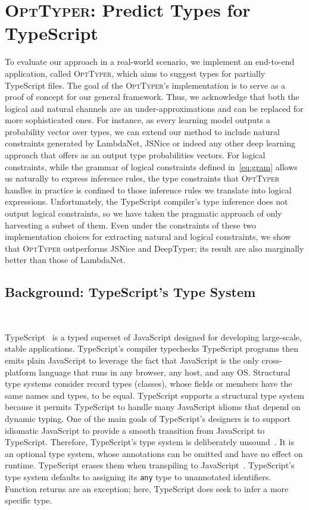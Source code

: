 \documentclass[acmsmall, review, anonymous]{acmart}\settopmatter{printfolios=true,printccs=false,printacmref=false}
\newcommand{\projectname}{\textsc{OptTyper}\xspace}
\begin{document}
\section{\projectname: Predict Types for TypeScript}
\label{sec:prodts}
To evaluate our approach in a real-world scenario, we
implement an end-to-end application, called \projectname, which aims
to suggest types for partially TypeScript files. The goal of the
\projectname{}'s implementation 
is to serve as a proof of concept for our general framework. Thus, we acknowledge that both the
logical and natural channels are an under-approximations and can be replaced for more
sophisticated ones. For instance, as every learning model outputs a probability vector
over types, we can extend our method to include natural constraints generated by LambdaNet, JSNice or indeed any other deep learning approach that offers as an output type probabilities vectors. 
For logical constraints, while
the grammar of logical constraints defined
in~\eqref{eq:gram} allows us naturally to express inference rules, the type constraints that \projectname handles in practice is confined to  
those inference rules we translate into logical expressions.
Unfortunately, the TypeScript compiler's type inference does not output logical constraints, so we 
have taken the pragmatic approach of only 
harvesting a subset of them. 
Even under the constraints of these two implementation choices for extracting natural and logical constraints, we show that \projectname outperforms JSNice and DeepTyper; its result are also marginally better than those of LambdaNet.

\subsection{Background: TypeScript's Type System}~\label{ssec:intro-typescript}

TypeScript~\citep{typescript} is a typed superset of
JavaScript designed for developing large-scale, stable applications.
TypeScript's compiler typechecks TypeScript programs then emits plain JavaScript
to leverage the fact that JavaScript is the only cross-platform
language that runs in any browser, any host, and any OS.
Structural type systems consider record types (classes), whose fields or members have the same names and types, to be equal.
TypeScript supports a
structural type system because it permits TypeScript to handle many JavaScript idioms that depend on dynamic typing.
One of the main goals of TypeScript's designers is to support idiomatic
JavaScript to
provide a smooth transition from JavaScript to TypeScript.
%
Therefore, TypeScript's type system is deliberately
unsound~\citep{understandtypescript}.  It is an optional type system, whose
annotations can be omitted and have no effect on runtime.  TypeScript erases 
them when transpiling to JavaScript~\citep{understandtypescript}.
TypeScript's type system defaults to assigning its \texttt{any} type to
unannotated identifiers.  Function returns are an exception;
here, TypeScript does seek to infer a more specific type.
\end{document}
